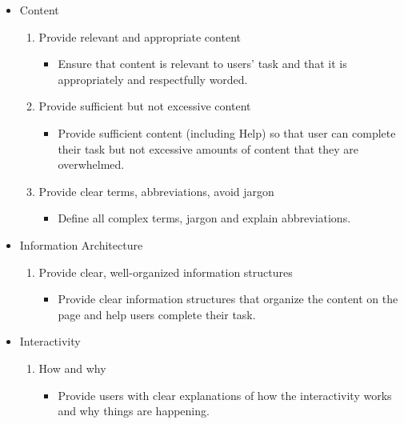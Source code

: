 \begin{itemize}
	\item Content
	\begin{enumerate}[resume]
		\item Provide relevant and appropriate content
		\begin{itemize}
			\item Ensure that content is relevant to users' task and that it is appropriately and respectfully worded.
		\end{itemize}
		\item Provide sufficient but not excessive content
		\begin{itemize}
			\item Provide sufficient content (including Help) so that user can complete their task but	not excessive amounts of content that they are overwhelmed.
		\end{itemize}
		\item Provide clear terms, abbreviations, avoid jargon
		\begin{itemize}
			\item Define all complex terms, jargon and explain abbreviations.
		\end{itemize}
	\end{enumerate}
	\item Information Architecture
	\begin{enumerate}[resume]
		\item Provide clear, well-organized information structures
		\begin{itemize}
			\item Provide clear information structures that organize the content on the page and help users complete their task.
		\end{itemize}
	\end{enumerate}
	\item Interactivity
	\begin{enumerate}[resume]
		\item How and why
		\begin{itemize}
			\item Provide users with clear explanations of how the interactivity works and why things are happening.


\end{itemize}
\end{enumerate}
\end{itemize}
